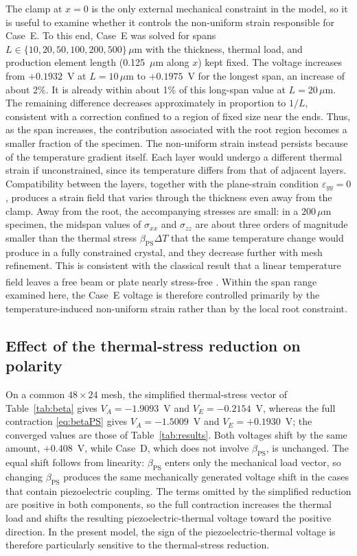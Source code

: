 \documentclass[a4paper, 11pt, twoside]{article}
\newcommand{\supercite}[1]{\!\!\textsuperscript{\cite{#1}}}
\begin{document}
The clamp at $x=0$ is the only external mechanical constraint in the model, so it is
useful to examine whether it controls the non-uniform strain responsible for Case~E.
To this end, Case~E was solved for spans
$L\in\{10,20,50,100,200,500\}\,\mu\text{m}$ with the thickness, thermal load, and
production element length (0.125~$\mu$m along $x$) kept fixed. The voltage increases
from $+0.1932$~V at $L=10\,\mu\text{m}$ to $+0.1975$~V for the longest span, an
increase of about 2\%. It is already within about 1\% of this long-span value at
$L=20\,\mu\text{m}$. The remaining difference decreases approximately in proportion
to $1/L$, consistent with a correction confined to a region of fixed size near the
ends. Thus, as the span increases, the contribution associated with the root region
becomes a smaller fraction of the specimen. The non-uniform strain instead persists
because of the temperature gradient itself. Each layer would undergo a different
thermal strain if unconstrained, since its temperature differs from that of adjacent
layers. Compatibility between the layers, together with the plane-strain condition
$\varepsilon_{yy}=0$, produces a strain field that varies through the thickness even
away from the clamp. Away from the root, the accompanying stresses are small: in a
$200\,\mu$m specimen, the midspan values of $\sigma_{xx}$ and $\sigma_{zz}$ are about
three orders of magnitude smaller than the thermal stress
$\beta_{\mathrm{PS}}\Delta T$ that the same temperature change would produce in a
fully constrained crystal, and they decrease further with mesh refinement. This is
consistent with the classical result that a linear temperature field leaves a free
beam or plate nearly stress-free \supercite{BoleyWeiner1997}. Within the span range
examined here, the Case~E voltage is therefore controlled primarily by the
temperature-induced non-uniform strain rather than by the local root constraint.

\subsection{Effect of the thermal-stress reduction on polarity}
\label{sec:polarity}

On a common $48\times24$ mesh, the simplified thermal-stress vector of
Table~\ref{tab:beta} gives $V_A=-1.9093$~V and $V_E=-0.2154$~V, whereas the full
contraction \eqref{eq:betaPS} gives $V_A=-1.5009$~V and $V_E=+0.1930$~V; the
converged values are those of Table~\ref{tab:results}. Both voltages shift by the same
amount, $+0.408$~V, while Case~D, which does not involve $\beta_{\mathrm{PS}}$, is
unchanged. The equal shift follows from linearity: $\beta_{\mathrm{PS}}$ enters only
the mechanical load vector, so changing $\beta_{\mathrm{PS}}$ produces the same
mechanically generated voltage shift in the cases that contain piezoelectric coupling.
The terms omitted by the simplified reduction are positive in both components, so the
full contraction increases the thermal load and shifts the resulting
piezoelectric-thermal voltage toward the positive direction. In the present model,
the sign of the piezoelectric-thermal voltage is therefore particularly sensitive to
the thermal-stress reduction.
\end{document}
